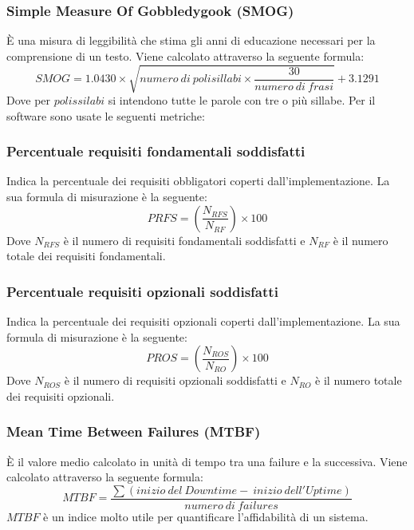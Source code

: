 		\subsubsection{Simple Measure Of Gobbledygook (SMOG)} È una misura di leggibilità che stima gli anni di educazione necessari per la comprensione di un testo. Viene calcolato attraverso la seguente formula: \newline
		\[
		SMOG=1.0430\times\sqrt{numero ~di ~polisillabi\times\frac{30}{numero ~di ~frasi}}+3.1291
		\]\newline
		Dove per $polissilabi$ si intendono tutte le parole con tre o più sillabe.
		\newline \newline \newline
		Per il software sono usate le seguenti metriche:\newline
		\subsubsection{Percentuale requisiti fondamentali soddisfatti} Indica la percentuale dei requisiti obbligatori coperti dall’implementazione. La sua
		formula di misurazione è la seguente:\newline
		\[
		PRFS=(\frac{N_{RFS}}{N_{RF}}) \times 100
		\]	
		Dove $N_{RFS}$ è il numero di requisiti fondamentali soddisfatti e $N_{RF}$ è il numero totale
		dei requisiti fondamentali.\clearpage
		\subsubsection{Percentuale requisiti opzionali soddisfatti} Indica la percentuale dei requisiti opzionali coperti dall’implementazione. La sua formula di misurazione è la seguente:\newline
		\[
		PROS=(\frac{N_{ROS}}{N_{RO}}) \times 100
		\]	
		Dove $N_{ROS}$ è il numero di requisiti opzionali soddisfatti e $N_{RO}$ è il numero totale
		dei requisiti opzionali.
		\subsubsection{Mean Time Between Failures (MTBF)} È il valore medio calcolato in unità di tempo tra una failure e la successiva. Viene calcolato attraverso la seguente formula:\newline
		\[
		MTBF=\frac{\sum(inizio ~del ~Downtime - ~inizio ~dell'Uptime)}{numero ~di ~failures}
		\]\newline
		$MTBF$ è un indice molto utile per quantificare l'affidabilità di un sistema.
